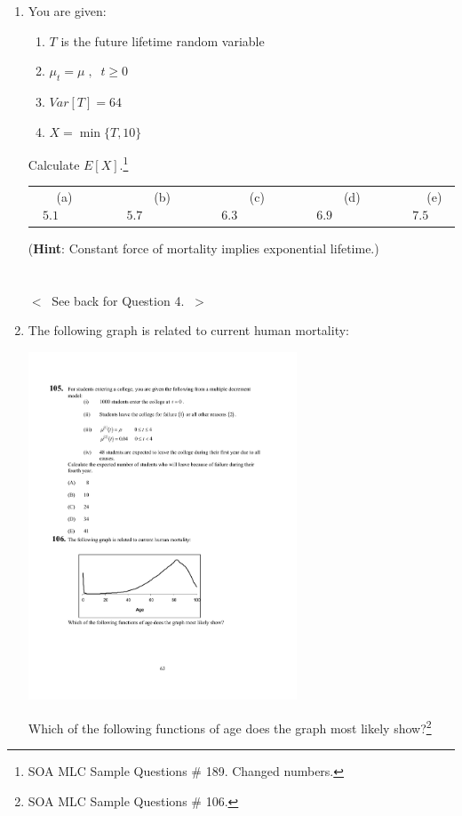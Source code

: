 \documentclass[11pt,fleqn,oneside]{book}
\begin{document}
\begin{enumerate}
\normalsize
\item You are given:
\begin{enumerate}
\item $T$ is the future lifetime random variable
\item $\mu_t=\mu\;,\;\;t \geq 0$
\item $Var[T] = 64$
\item $X=\min\{T,10\}$
\end{enumerate}
Calculate $E[X]$.\footnote[3]{SOA MLC Sample Questions \# 189. Changed numbers.}

\vspace{0.35cm}
\small
\begin{center}
\begin{tabular}{c c c c c}
(a) $5.1\;\;\;\;\;\;\;\;$ & 
$\;\;\;\;\;\;\;\;$(b) $5.7\;\;\;\;\;\;\;\;$ &
$\;\;\;\;\;\;\;\;$(c) $6.3\;\;\;\;\;\;\;\;$ & 
$\;\;\;\;\;\;\;\;$(d) $6.9 \;\;\;\;\;\;\;\;$ &
$\;\;\;\;\;\;\;\;$(e) $7.5$ 
\end{tabular}
\end{center}
(\textbf{Hint}: Constant force of mortality implies exponential lifetime.)\\
$\;$\\
$\;$\\
\vspace{0.2cm}
$<\;\;$See back for Question 4.$\;\;>$

\newpage
\normalsize
\item The following graph is related to current human mortality:
\begin{center}
\includegraphics[width=8cm]{Graphs/Quiz2.pdf}
\end{center}
Which of the following functions of age does the graph most likely show?\footnote[4]{SOA MLC Sample Questions \# 106.}


\end{enumerate}
\end{document}
